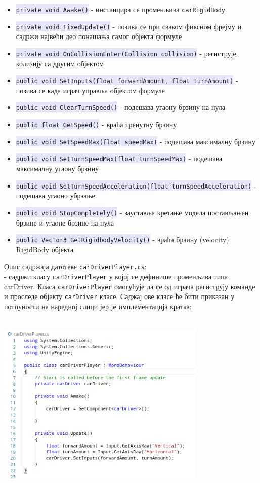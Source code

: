 \documentclass[12pt]{article}
\newcommand{\mycode}[1]{\texttt{\colorbox{Lavender}{#1}}}
\begin{document}
\begin{itemize}
  \item \mycode{private void Awake()} - инстанцира се променљива \texttt{carRigidBody}
  \item \mycode{private void FixedUpdate()} - позива се при сваком фиксном фрејму и садржи највећи део понашања самог објекта формуле
  \item \mycode{private void OnCollisionEnter(Collision collision)} - региструје колизију са другим објектом
  \item \mycode{public void SetInputs(float forwardAmount, float turnAmount)} - позива се када играч управља објектом формуле
  \item \mycode{public void ClearTurnSpeed()} - подешава угаону брзину на нула
  \item \mycode{public float GetSpeed()} - враћа тренутну брзину
  \item \mycode{public void SetSpeedMax(float speedMax)} - подешава максималну брзину
  \item \mycode{public void SetTurnSpeedMax(float turnSpeedMax)} - подешава максималну угаону брзину
  \item \mycode{public void SetTurnSpeedAcceleration(float turnSpeedAcceleration)} - подешава угаоно убрзање
  \item \mycode{public void StopCompletely()} - зауставља кретање модела постављањен брзине и угаоне брзине на нула
  \item \mycode{public Vector3 GetRigidbodyVelocity()} - враћа брзину (velocity) RigidBody објекта
\end{itemize}
\vspace{0.5cm}
Опис садржаја датотеке \texttt{carDriverPlayer.cs}:\\
- садржи класу \texttt{carDriverPlayer} у којој се дефинише променљива типа carDriver. Класа \texttt{carDriverPlayer} омогућује да се од играча региструју команде и проследе објекту \texttt{carDriver} класе. Саджај ове класе ће бити приказан у потпуности на наредној слици јер је имплементација кратка:
\begin{center}
    \centering 
    \includegraphics[height=9cm, width=10cm]{images/carDriverPlayer.png}
\end{center}
\end{document}
